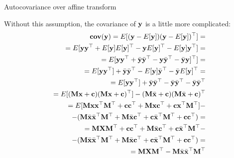 \documentclass{beamer}
\begin{document}
\begin{frame}{Autocovariance over affine transform}
	\begin{flushleft}
		
		Without this assumption, the covariance of $\mathbf{y}$ is a little more complicated:
		\begin{align*}
			\textbf{cov}(\mathbf{y}) = E[(\mathbf{y} - E[\mathbf{y}])(\mathbf{y} - E[\mathbf{y}])^\top] =
			\\
			= E[\mathbf{y}\mathbf{y}^\top
			+ E[\mathbf{y}]E[\mathbf{y}]^\top
			- \mathbf{y}E[\mathbf{y}]^\top
			- E[\mathbf{y}]\mathbf{y}^\top] =
			\\
			=
			E[\mathbf{y}\mathbf{y}^\top
			+ \bar{\mathbf{y}}\bar{\mathbf{y}}^\top
			- \mathbf{y}\bar{\mathbf{y}}^\top
			- \bar{\mathbf{y}}\mathbf{y}]^\top]=
			\\
			=
			E[\mathbf{y}\mathbf{y}^\top]
			+ \bar{\mathbf{y}}\bar{\mathbf{y}}^\top
			- E[\mathbf{y}]\bar{\mathbf{y}}^\top
			- \bar{\mathbf{y}}E[\mathbf{y}]^\top=
			\\
			=
			E[\mathbf{y}\mathbf{y}^\top]
			+ \bar{\mathbf{y}}\bar{\mathbf{y}}^\top
			- \bar{\mathbf{y}}\bar{\mathbf{y}}^\top
			- \bar{\mathbf{y}}\bar{\mathbf{y}}^\top
			\\
			=
			E[(\mathbf{M}\mathbf{x} + \mathbf{c})(\mathbf{M}\mathbf{x} + \mathbf{c})^\top]
			- (\mathbf{M}\bar{\mathbf{x}} + \mathbf{c})(\mathbf{M}\bar{\mathbf{x}} + \mathbf{c})^\top
			\\
			=
			E[\mathbf{M}\mathbf{x}\mathbf{x}^\top \mathbf{M}^\top+
			\mathbf{c}\mathbf{c}^\top+
			\mathbf{M}\mathbf{x}\mathbf{c}^\top+
			\mathbf{c}\mathbf{x}^\top \mathbf{M}^\top]
			-\\
			- (\mathbf{M}\bar{\mathbf{x}}\bar{\mathbf{x}}^\top\mathbf{M}^\top +
			\mathbf{M}\bar{\mathbf{x}}\mathbf{c}^\top+
			\mathbf{c}\bar{\mathbf{x}}^\top\mathbf{M}^\top+
			\mathbf{c}\mathbf{c}^\top)=
			\\
			=
			\mathbf{M}\mathbf{X} \mathbf{M}^\top+
			\mathbf{c}\mathbf{c}^\top+
			\mathbf{M}\bar{\mathbf{x}}\mathbf{c}^\top+
			\mathbf{c}\bar{\mathbf{x}}^\top \mathbf{M}^\top
			-\\
			- (\mathbf{M}\bar{\mathbf{x}}\bar{\mathbf{x}}^\top\mathbf{M}^\top +
			\mathbf{M}\bar{\mathbf{x}}\mathbf{c}^\top+
			\mathbf{c}\bar{\mathbf{x}}^\top\mathbf{M}^\top+
			\mathbf{c}\mathbf{c}^\top)=
			\\
			=
			\mathbf{M}\mathbf{X} \mathbf{M}^\top
			- \mathbf{M}\bar{\mathbf{x}}\bar{\mathbf{x}}^\top\mathbf{M}^\top
		\end{align*}
		
	\end{flushleft}
\end{frame}


\begin{frame}
	\begin{flushleft}
		
		
	\end{flushleft}
\end{frame}
\end{document}
